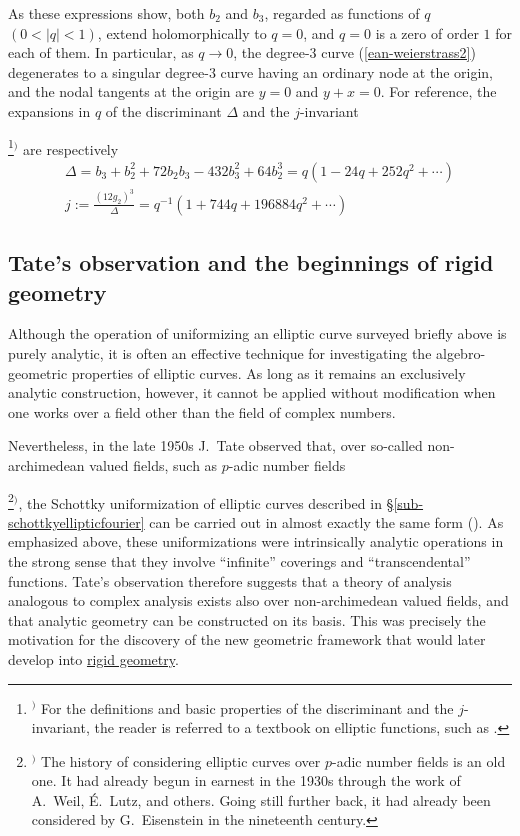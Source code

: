 \documentclass[a4paper,12pt, dvipdfmx]{jsbook}
\newcommand{\abs}[1]{\lvert#1\rvert}
\theoremstyle{plain}
\theoremstyle{definition}
\newcounter{chushaku}
\def\chu#1{\addtocounter{chushaku}{1}\footnote[\value{chushaku}]{${}^)$ #1}${}^)$}
\begin{document}
As these expressions show, both $b_2$ and $b_3$, regarded as functions of $q$ $(0<\abs{q}<1)$, extend holomorphically to $q=0$, and $q=0$ is a zero of order $1$ for each of them.
In particular, as $q\rightarrow 0$, the degree-$3$ curve (\ref{ean-weierstrass2}) degenerates to a singular degree-$3$ curve having an ordinary node at the origin, and the nodal tangents at the origin are $y=0$ and $y+x=0$.
For reference, the expansions in $q$ of the discriminant $\Delta$ and the $j$-invariant\chu{For the definitions and basic properties of the discriminant and the $j$-invariant, the reader is referred to a textbook on elliptic functions, such as \cite{HC}.} are respectively
\begin{equation}\label{ean-deltaj}
\begin{array}{l}
\Delta=b_3+b^2_2+72b_2b_3-432b^2_3+64b^3_2=q(1-24q+252q^2+\cdots)\\
{\displaystyle j:=\frac{(12g_2)^3}{\Delta}=q^{-1}(1+744q+196884q^2+\cdots)}
\end{array}
\end{equation}

\subsection{Tate's observation and the beginnings of rigid geometry}\label{sub-obsTatestartrigidgeom}
Although the operation of uniformizing an elliptic curve surveyed briefly above is purely analytic, it is often an effective technique for investigating the algebro-geometric properties of elliptic curves.
As long as it remains an exclusively analytic construction, however, it cannot be applied without modification when one works over a field other than the field of complex numbers.

Nevertheless, in the late 1950s J.\ Tate observed that, over so-called non-archimedean valued fields, such as $p$-adic number fields\chu{The history of considering elliptic curves over $p$-adic number fields is an old one. It had already begun in earnest in the 1930s through the work of A.\ Weil, \'{E}.\ Lutz, and others. Going still further back, it had already been considered by G.\ Eisenstein in the nineteenth century.}, the Schottky uniformization of elliptic curves described in \S\ref{sub-schottkyellipticfourier} can be carried out in almost exactly the same form (\cite{Tate2}).
As emphasized above, these uniformizations were intrinsically analytic operations in the strong sense that they involve ``infinite'' coverings and ``transcendental'' functions. Tate's observation therefore suggests that a theory of analysis analogous to complex analysis exists also over non-archimedean valued fields, and that analytic geometry can be constructed on its basis.
This was precisely the motivation for the discovery of the new geometric framework that would later develop into \underline{rigid geometry}.
\end{document}
